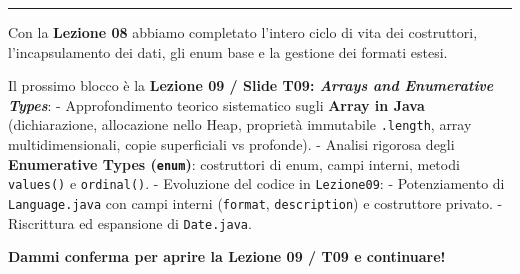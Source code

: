 \documentclass[11pt,a4paper]{article}
\newcommand{\passthrough}[1]{#1}
\begin{document}
\begin{center}\rule{0.5\linewidth}{0.5pt}\end{center}

\begin{studynote} Con la \textbf{Lezione 08} abbiamo completato l'intero ciclo
di vita dei costruttori, l'incapsulamento dei dati, gli enum base e la
gestione dei formati estesi.

Il prossimo blocco è la \textbf{Lezione 09 / Slide T09: \emph{Arrays and
Enumerative Types}}: - Approfondimento teorico sistematico sugli
\textbf{Array in Java} (dichiarazione, allocazione nello Heap, proprietà
immutabile \passthrough{\lstinline!.length!}, array multidimensionali,
copie superficiali vs profonde). - Analisi rigorosa degli
\textbf{Enumerative Types (\passthrough{\lstinline!enum!})}: costruttori
di enum, campi interni, metodi \passthrough{\lstinline!values()!} e
\passthrough{\lstinline!ordinal()!}. - Evoluzione del codice in
\passthrough{\lstinline!Lezione09!}: - Potenziamento di
\passthrough{\lstinline!Language.java!} con campi interni
(\passthrough{\lstinline!format!},
\passthrough{\lstinline!description!}) e costruttore privato. -
Riscrittura ed espansione di \passthrough{\lstinline!Date.java!}.
\end{studynote}

\textbf{Dammi conferma per aprire la Lezione 09 / T09 e continuare!}
\end{document}
